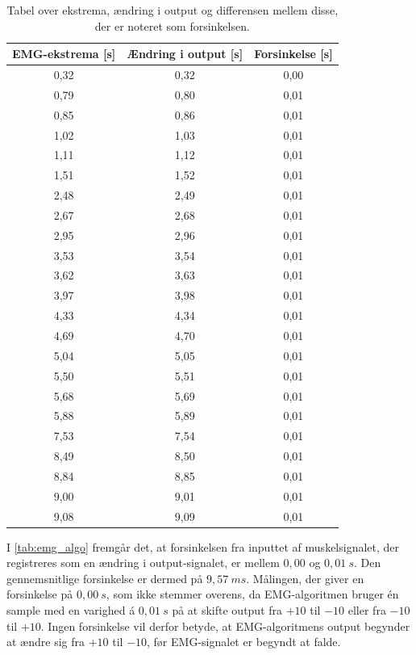 \begin{table}[H]
\centering
\begin{tabular}{|c|c|c|}
\hline 
\textbf{EMG-ekstrema [s]} & \textbf{Ændring i output [s]} & \textbf{Forsinkelse [s]}\\ 
\hline 
0,32 & 0,32 & 0,00\\ 
\hline 
0,79 & 0,80 & 0,01\\ 
\hline 
0,85 & 0,86 & 0,01\\ 
\hline 
1,02 & 1,03 & 0,01\\ 
\hline 
1,11 & 1,12 & 0,01\\ 
\hline 
1,51 & 1,52 & 0,01\\ 
\hline 
2,48 & 2,49 & 0,01\\ 
\hline 
2,67 & 2,68 & 0,01\\ 
\hline 
2,95 & 2,96 & 0,01\\ 
\hline 
3,53 & 3,54 & 0,01\\ 
\hline 
3,62 & 3,63 & 0,01\\ 
\hline 
3,97 & 3,98 & 0,01\\ 
\hline 
4,33 & 4,34 & 0,01\\ 
\hline 
4,69 & 4,70 & 0,01\\ 
\hline 
5,04 & 5,05 & 0,01\\ 
\hline 
5,50 & 5,51 & 0,01\\ 
\hline 
5,68 & 5,69 & 0,01\\ 
\hline 
5,88 & 5,89 & 0,01\\ 
\hline 
7,53 & 7,54 & 0,01\\ 
\hline 
8,49 & 8,50 & 0,01\\ 
\hline 
8,84 & 8,85 & 0,01\\ 
\hline 
9,00 & 9,01 & 0,01\\ 
\hline 
9,08 & 9,09 & 0,01\\ 
\hline 
\end{tabular} 
\caption{Tabel over ekstrema, ændring i output og differensen mellem disse, der er noteret som forsinkelsen.}
\label{tab:emg_algo}
\end{table}

\noindent
I \autoref{tab:emg_algo} fremgår det, at forsinkelsen fra inputtet af muskelsignalet, der registreres som en ændring i output-signalet, er mellem $0,00$ og $0,01~s$. 
Den gennemsnitlige forsinkelse er dermed på $9,57~ms$. 
Målingen, der giver en forsinkelse på $0,00~s$, som ikke stemmer overens, da EMG-algoritmen bruger én sample med en varighed á $0,01~s$ på at skifte output fra $+10$ til $-10$ eller fra $-10$ til $+10$. 
Ingen forsinkelse vil derfor betyde, at EMG-algoritmens output begynder at ændre sig fra $+10$ til $-10$, før EMG-signalet er begyndt at falde. 

